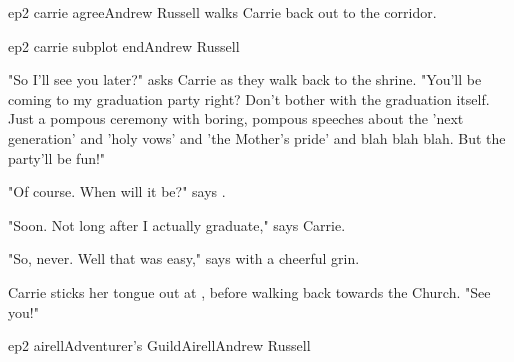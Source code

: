 \documentclass{book}
\begin{document}
\begin{childnode}{ep2 carrie agree}{Andrew Russell}
     \name{} walks Carrie back out to the corridor.






\end{childnode}

\begin{childnode}{ep2 carrie subplot end}{Andrew Russell}


    "So I'll see you later?" asks Carrie as they walk back to the shrine. "You'll be coming to my graduation party right? Don't bother with the graduation itself. Just a pompous ceremony with 
    boring, pompous speeches about the
    'next generation' and 'holy vows' and 'the Mother's pride' and blah blah blah. But the party'll be fun!"

    "Of course. When will it be?" says \name{}.

    "Soon. Not long after I actually graduate," says Carrie.

    "So, never. Well that was easy," says \name{} with a cheerful grin.

    Carrie sticks her tongue out at \name{}, before walking back towards the Church. "See you!"


\end{childnode}


\begin{node}{ep2 airell}{Adventurer's Guild}{Airell}{Andrew Russell}





\end{node}
\end{document}
